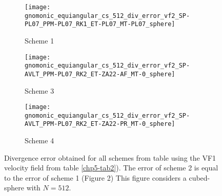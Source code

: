 \begin{figure}[!htb]
	\centering
	\begin{subfigure}{0.3\textwidth}
		\centering
		\texttt{[image: gnomonic\_equiangular\_cs\_512\_div\_error\_vf2\_SP-PL07\_PPM-PL07\_RK1\_ET-PL07\_MT-PL07\_sphere]}
		\caption{Scheme 1 \label{chp5-div1}}
	\end{subfigure}
	\begin{subfigure}{0.3\textwidth}
	\centering
	\texttt{[image: gnomonic\_equiangular\_cs\_512\_div\_error\_vf2\_SP-AVLT\_PPM-PL07\_RK2\_ET-ZA22-AF\_MT-0\_sphere]}
	\caption{Scheme 3 \label{chp5-div2}}
	\end{subfigure}
	\begin{subfigure}{0.3\textwidth}
	\centering
	\texttt{[image: gnomonic\_equiangular\_cs\_512\_div\_error\_vf2\_SP-AVLT\_PPM-PL07\_RK2\_ET-ZA22-PR\_MT-0\_sphere]}
	\caption{Scheme 4 \label{chp5-div3}}
	\end{subfigure}
	\caption{ Divergence error obtained for all schemes from table using the VF1 velocity field from table \ref{chp5-tab2}).
		The error of scheme 2 is equal to the error of scheme 1 (Figure 2)
		This figure considers a cubed-sphere with $N=512$. \label{chp5-div}}
\end{figure}


